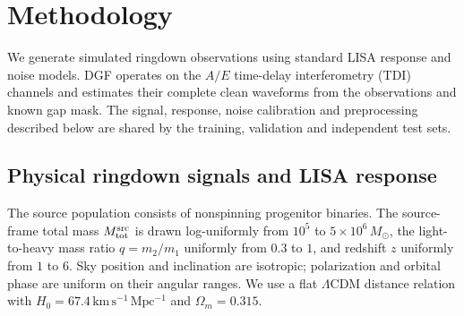 \documentclass[10pt,prd,aps,a4paper,twocolumn,superscriptaddress,nofootinbib,floatfix]{revtex4-2}
\begin{document}
\section{Methodology}\label{sec:method}
We generate simulated ringdown observations using standard LISA response and noise models. DGF operates on the $A/E$ time-delay interferometry (TDI) channels and estimates their complete clean waveforms from the observations and known gap mask. The signal, response, noise calibration and preprocessing described below are shared by the training, validation and independent test sets.

\subsection{Physical ringdown signals and LISA response}\label{sec:physical_signals}
The source population consists of nonspinning progenitor binaries. The source-frame total mass $M_{\rm tot}^{\rm src}$ is drawn log-uniformly from $10^5$ to $5\times10^6\,M_\odot$, the light-to-heavy mass ratio $q=m_2/m_1$ uniformly from $0.3$ to $1$, and redshift $z$ uniformly from $1$ to $6$. Sky position and inclination are isotropic; polarization and orbital phase are uniform on their angular ranges. We use a flat $\Lambda$CDM distance relation with $H_0=67.4\,\mathrm{km\,s^{-1}\,Mpc^{-1}}$ and $\Omega_m=0.315$.
\end{document}
